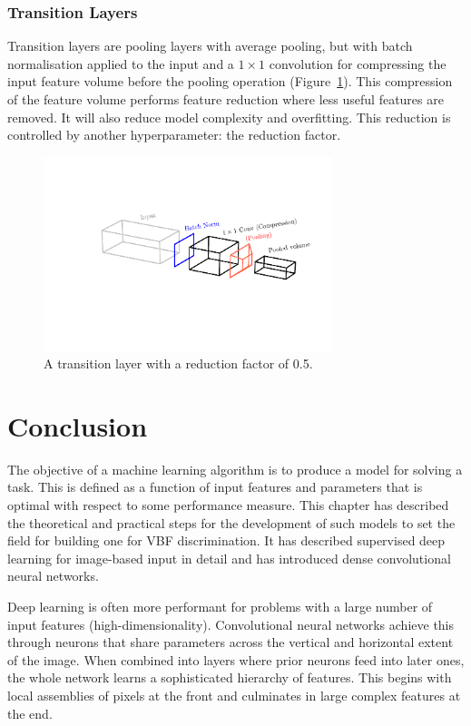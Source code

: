 \subsubsection{Transition Layers}
Transition layers are pooling layers with average pooling, but with batch normalisation applied to the input and a $1\times{}1$ convolution for compressing the input feature volume before the pooling operation (Figure~\ref{fig:machine_learning:transition_layer}). 
This compression of the feature volume performs feature reduction where less useful features are removed. It will also reduce model complexity and overfitting. This reduction is controlled by another hyperparameter: the reduction factor. 
\begin{figure}[h!]
    \centering
    \includegraphics[width=0.75\textwidth]{figures/machine_learning/transition_layer.pdf}
    \caption{A transition layer with a reduction factor of 0.5.}
        \label{fig:machine_learning:transition_layer}
\end{figure}




\section{Conclusion}
The objective of a machine learning algorithm is to produce a model for solving a task. 
This is defined as a function of input features and parameters that is optimal with respect to some performance measure. 
This chapter has described the theoretical and practical steps for the development of such models to set the field for building one for VBF discrimination.  
It has described supervised deep learning for image-based input in detail and has introduced dense convolutional neural networks.

Deep learning is often more performant for problems with a large number of input features (high-dimensionality). 
Convolutional neural networks achieve this through neurons that share parameters across the vertical and horizontal extent of the image.  
When combined into layers where prior neurons feed into later ones, the whole network learns a sophisticated hierarchy of features. 
This begins with local assemblies of pixels at the front and culminates in large complex features at the end. 

